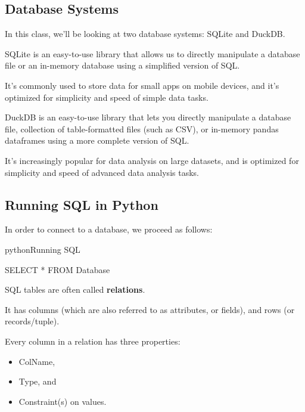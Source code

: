 \documentclass[openany]{book}
\begin{document}
\subsection{Database Systems}
In this class, we'll be looking at two database systems: SQLite and DuckDB.

\begin{defn}[SQLite]
	SQLite is an easy-to-use library that allows us to directly manipulate a database file or an in-memory database using a simplified version of SQL.
	
	It's commonly used to store data for small apps on mobile devices, and it's optimized for simplicity and speed of simple data tasks.
\end{defn}

\begin{defn}[DuckDB]
	DuckDB is an easy-to-use library that lets you directly manipulate a database file, collection of table-formatted files (such as CSV), or in-memory pandas dataframes using a more complete version of SQL.
	
	It's increasingly popular for data analysis on large datasets, and is optimized for simplicity and speed of advanced data analysis tasks.
\end{defn}

\subsection{Running SQL in Python}
In order to connect to a database, we proceed as follows:
\begin{code}{python}{Running SQL}


SELECT * FROM Database
\end{code}

\begin{defn}[Relation]
	SQL tables are often called \textbf{relations}.
	
	It has columns (which are also referred to as attributes, or fields), and rows (or records/tuple).
\end{defn}

Every column in a relation has three properties:
\begin{itemize}
	\item ColName,
	\item Type, and
	\item Constraint(s) on values.
\end{itemize}
\end{document}
